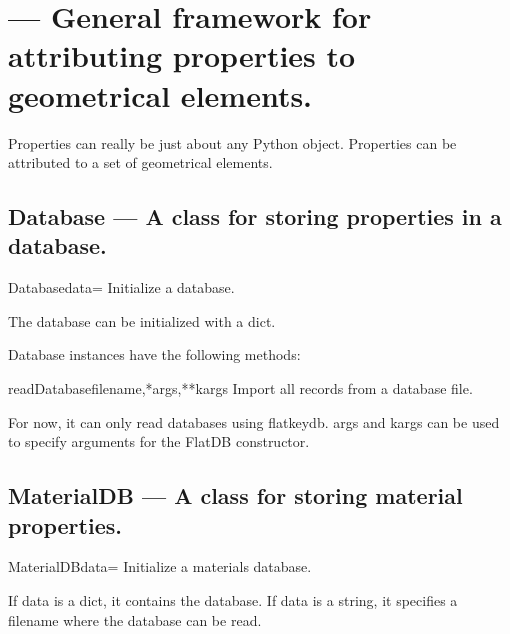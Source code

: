 

\section{ --- General framework for attributing properties to geometrical elements.}
\label{sec:properties}


Properties can really be just about any Python object.
Properties can be attributed to a set of geometrical elements.


\subsection{Database --- A class for storing properties in a database.}


\begin{classdesc}{Database}{data={}}
Initialize a database.

        The database can be initialized with a dict.
        
\end{classdesc}

Database instances have the following methods:

\begin{funcdesc}{readDatabase}{filename,*args,**kargs}
Import all records from a database file.

        For now, it can only read databases using flatkeydb.
        args and kargs can be used to specify arguments for the
        FlatDB constructor.
        
\end{funcdesc}

\subsection{MaterialDB --- A class for storing material properties.}


\begin{classdesc}{MaterialDB}{data={}}
Initialize a materials database.

        If data is a dict, it contains the database.
        If data is a string, it specifies a filename where the
        database can be read.
        
\end{classdesc}

